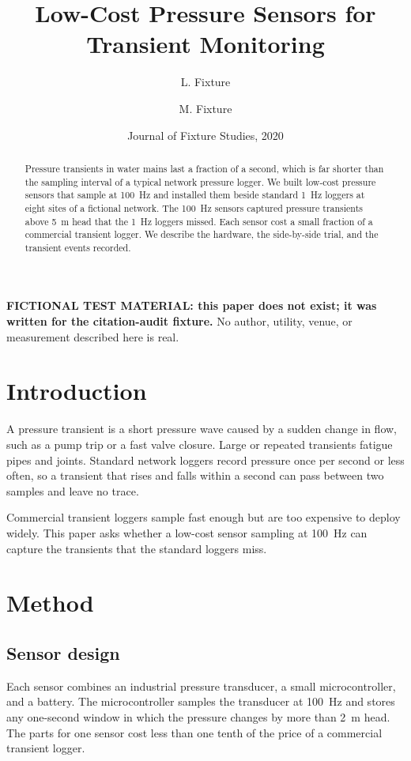 \documentclass{article}
\title{Low-Cost Pressure Sensors for Transient Monitoring}
\author{L. Fixture \and M. Fixture}
\date{Journal of Fixture Studies, 2020}
\begin{document}
\maketitle

\noindent\textbf{FICTIONAL TEST MATERIAL: this paper does not exist; it was
written for the citation-audit fixture.} No author, utility, venue, or
measurement described here is real.

\begin{abstract}
Pressure transients in water mains last a fraction of a second, which is far
shorter than the sampling interval of a typical network pressure logger. We
built low-cost pressure sensors that sample at 100~Hz and installed them beside
standard 1~Hz loggers at eight sites of a fictional network. The 100~Hz sensors
captured pressure transients above 5~m head that the 1~Hz loggers missed. Each
sensor cost a small fraction of a commercial transient logger. We describe the
hardware, the side-by-side trial, and the transient events recorded.
\end{abstract}

\section{Introduction}
\label{sec:introduction}

A pressure transient is a short pressure wave caused by a sudden change in
flow, such as a pump trip or a fast valve closure. Large or repeated transients
fatigue pipes and joints. Standard network loggers record pressure once per
second or less often, so a transient that rises and falls within a second can
pass between two samples and leave no trace.

Commercial transient loggers sample fast enough but are too expensive to deploy
widely. This paper asks whether a low-cost sensor sampling at 100~Hz can
capture the transients that the standard loggers miss.

\section{Method}
\label{sec:method}

\subsection{Sensor design}
\label{sec:method-sensor}

Each sensor combines an industrial pressure transducer, a small
microcontroller, and a battery. The microcontroller samples the transducer at
100~Hz and stores any one-second window in which the pressure changes by more
than 2~m head. The parts for one sensor cost less than one tenth of the price
of a commercial transient logger.
\end{document}
